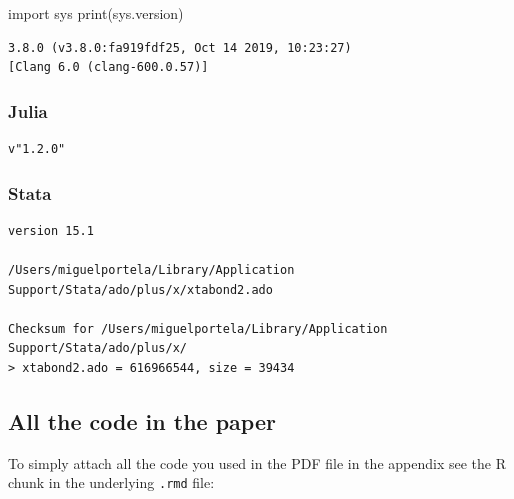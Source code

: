 \documentclass[
  12pt,
]{article}
\newenvironment{Shaded}{\begin{snugshade}}{\end{snugshade}}
\newcommand{\BuiltInTok}[1]{#1}
\newcommand{\ImportTok}[1]{#1}
\newcommand{\NormalTok}[1]{#1}
\begin{document}
\begin{Shaded}
\begin{Highlighting}[]
\ImportTok{import}\NormalTok{ sys}
\BuiltInTok{print}\NormalTok{(sys.version)}
\end{Highlighting}
\end{Shaded}

\begin{verbatim}
3.8.0 (v3.8.0:fa919fdf25, Oct 14 2019, 10:23:27) 
[Clang 6.0 (clang-600.0.57)]
\end{verbatim}

\hypertarget{julia}{%
\subsubsection{Julia}\label{julia}}

\begin{verbatim}
v"1.2.0"
\end{verbatim}

\hypertarget{stata}{%
\subsubsection{Stata}\label{stata}}

\begin{verbatim}
version 15.1

/Users/miguelportela/Library/Application Support/Stata/ado/plus/x/xtabond2.ado

Checksum for /Users/miguelportela/Library/Application Support/Stata/ado/plus/x/
> xtabond2.ado = 616966544, size = 39434
\end{verbatim}

\hypertarget{all-the-code-in-the-paper}{%
\subsection{All the code in the paper}\label{all-the-code-in-the-paper}}

To simply attach all the code you used in the PDF file in the appendix see the R chunk in the underlying \texttt{.rmd} file:
\end{document}
